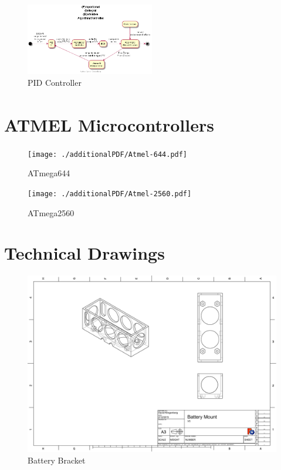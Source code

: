 \documentclass[pdftex,11pt]{article}
\begin{document}
\begin{figure}[!h]
	\centering
		\includegraphics[width=0.5\textwidth]{./plantUML/PIDloop}
	\caption{PID Controller}
	\label{fig:PIDloop}
\end{figure}

\clearpage
\section{ATMEL\textsuperscript{\textcopyright} Microcontrollers}
\label{sec:appATMEL}
\begin{figure}[!h]
	\centering
		\texttt{[image: ./additionalPDF/Atmel-644.pdf]}
	\caption{ATmega644}
	\label{fig:ATmega644}
\end{figure}

\begin{figure}[!h]
	\centering
		\texttt{[image: ./additionalPDF/Atmel-2560.pdf]}
	\caption{ATmega2560}
	\label{fig:ATmega2560}
\end{figure}

\clearpage

\section{Technical Drawings}
\label{sec:TechDraw}

\begin{figure}[!h]
	\centering
		\includegraphics[width=1\textwidth]{./graphics/BatteryBoxV5-eps-converted-to.pdf}
	\caption{Battery Bracket}
	\label{fig:BattBin}
\end{figure}
\end{document}
